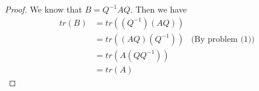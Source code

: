 \begin{homeworkProblem}

\solution
\begin{proof}
We know that  $B = Q^{-1}AQ$. Then we have
\[
\begin{aligned}
    tr(B) &= tr((Q^{-1})(AQ)) \\
          &= tr((AQ)(Q^{-1})) & \text{(By problem (1))}\\
          &= tr(A(QQ^{-1})) \\
          &= tr(A)
\end{aligned}
\]
\end{proof}

\end{homeworkProblem}
